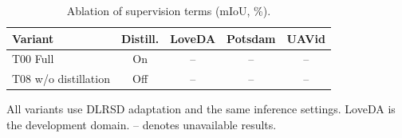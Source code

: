 \begin{table}[!tb]
\centering
\caption{Ablation of supervision terms (mIoU, \%).}
\label{tab:ablation_losses}
\small
\setlength{\tabcolsep}{2pt}
\begin{tabular}{L{0.28\columnwidth}cccc}
\toprule
Variant & Distill. & LoveDA & Potsdam & UAVid\\
\midrule
T00 Full & On & -- & -- & --\\
T08 w/o distillation & Off & -- & -- & --\\
\bottomrule
\end{tabular}
\par\vspace{3pt}
\begin{minipage}{\columnwidth}
\footnotesize All variants use DLRSD adaptation and the same inference settings. LoveDA is the development domain. -- denotes unavailable results.
\end{minipage}
\end{table}
